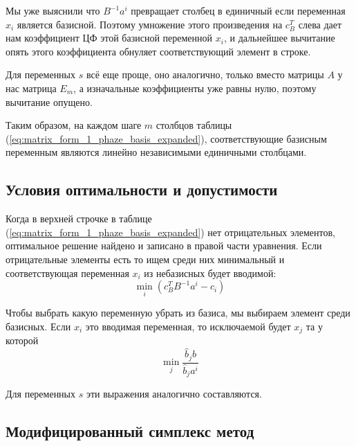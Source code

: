 \documentclass[a4paper,article,14pt]{extarticle}
\begin{document}
Мы уже выяснили что \(B^{-1}a^i\) превращает столбец в единичный если переменная \(x_i\) является базисной. Поэтому умножение этого произведения на \(c_B^T\) слева дает нам коэффициент ЦФ этой базисной переменной \(x_i\), и дальнейшее вычитание опять этого коэффициента обнуляет соответствующий элемент в строке.

Для переменных \(s\) всё еще проще, оно аналогично, только вместо матрицы \(A\) у нас матрица \(E_m\), а изначальные коэффициенты уже равны нулю, поэтому вычитание опущено.

%
%
%

Таким образом, на каждом шаге \(m\) столбцов таблицы (\ref{eq:matrix_form_1_phaze_basis_expanded}), соответствующие базисным переменным являются линейно независимыми единичными столбцами.

\subsection{Условия оптимальности и допустимости}

Когда в верхней строчке в таблице (\ref{eq:matrix_form_1_phaze_basis_expanded}) нет отрицательных элементов, оптимальное решение найдено и записано в правой части уравнения.
Если отрицательные элементы есть то ищем среди них минимальный и соответствующая переменная \(x_i\) из небазисных будет вводимой:
\begin{equation} \label{eq:matrix_form_optimality}
    \min_i (c_B^TB^{-1} a^i-c_i)
\end{equation}

Чтобы выбрать какую переменную убрать из базиса, мы выбираем элемент среди базисных.
Если \(x_i\) это вводимая переменная, то исключаемой будет \(x_j\) та у которой
\begin{equation} \label{eq:matrix_form_feasibility}
    \min_j \frac{\hat b_jb}{\hat b_ja^i}
\end{equation}

Для переменных \(s\) эти выражения аналогично составляются.

\subsection{Модифицированный симплекс метод}
\end{document}
